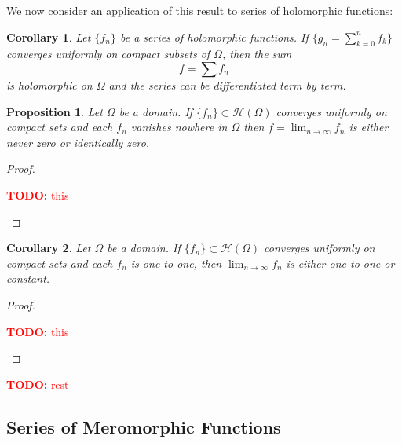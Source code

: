 \documentclass{article}
\newtheorem{corollary}{Corollary}
\newcommand{\mc}[1]{\mathcal{#1}}
\newtheorem{proposition}{Proposition}
\newcommand{\TODO}[1]{\begin{center}\huge{\textcolor{red}{\textbf{TODO:} #1}}\end{center}}
\begin{document}
We now consider an application of this result to series of holomorphic functions:
\begin{corollary}
Let \(\{f_n\}\) be a series of holomorphic functions. If \(\{g_n = \sum_{k = 0}^nf_k\}\) converges uniformly on compact subsets of \(\Omega\), then the sum
\begin{equation}f = \sum f_n\end{equation}
is holomorphic on \(\Omega\) and the series can be differentiated term by term.
\end{corollary}
\begin{proposition}
Let \(\Omega\) be a domain. If \(\{f_n\} \subset \mc{H}(\Omega)\) converges uniformly on compact sets and each \(f_n\) vanishes nowhere in \(\Omega\) then \(f = \lim_{n \to \infty}f_n\) is either never zero or identically zero.
\end{proposition}
\begin{proof}
\TODO{this}
\end{proof}
\begin{corollary}
Let \(\Omega\) be a domain. If \(\{f_n\} \subset \mc{H}(\Omega)\) converges uniformly on compact sets and each \(f_n\) is one-to-one, then \(\lim_{n \to \infty}f_n\) is either one-to-one or constant.
\end{corollary}
\begin{proof}
\TODO{this}
\end{proof}

\TODO{rest}

\subsection{Series of Meromorphic Functions}
\end{document}
